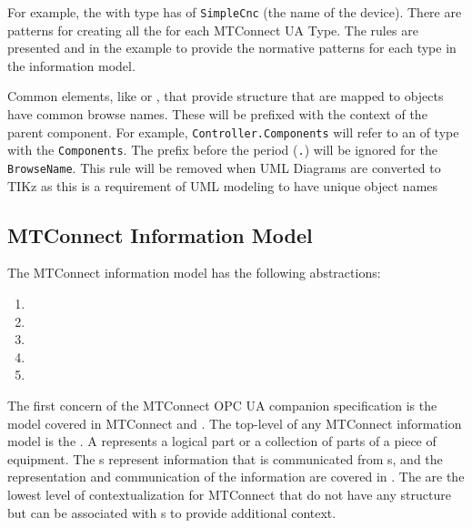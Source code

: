 For example, the with type  has  of \texttt{SimpleCnc} (the name of the device). There are patterns for creating all the  for each MTConnect UA Type. The rules are presented and in the example to provide the normative patterns for each type in the information model.

Common elements, like  or , that provide structure that are mapped to  objects have common browse names. These will be prefixed with the context of the parent component. For example, \texttt{Controller.Components} will refer to an  of type  with the  \texttt{Components}. The prefix before the period (\texttt{.}) will be ignored for the \texttt{BrowseName}. {\color{red} This rule will be removed when UML Diagrams are converted to TIKz as this is a requirement of UML modeling to have unique object names}

\FloatBarrier

\subsection{MTConnect Information Model}

The MTConnect information model has the following abstractions:

\begin{enumerate}
  \item {}
  \item {}
  \item {}
  \item {}
  \item {}
\end{enumerate}

The first concern of the MTConnect OPC UA companion specification is the  model covered in MTConnect \cite{MTCPart2} and \cite{MTCPart3}. The top-level  of any MTConnect information model is the . A  represents a logical part or a collection of parts of a piece of equipment. The s represent information that is communicated from s, and the representation and communication of the information are covered in \cite{MTCPart3}. The  are the lowest level of contextualization for MTConnect  that do not have any structure but can be associated with s to provide additional context. 

